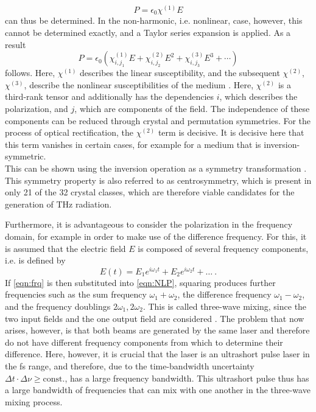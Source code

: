 \begin{equation}
    P =  \epsilon_0 \chi^{(1)}E
\end{equation}
can thus be determined.
In the non-harmonic, i.e. nonlinear, case, however, this cannot be determined exactly, and a
Taylor series expansion is applied.
As a result
\begin{equation}
    \label{eqn:NLP}
    P = \epsilon_0 \left(\chi^{(1)}_{i,j_1}E+\chi^{(2)}_{i,j_2}E^2+\chi^{(3)}_{i,j_3}E^3+\dotsb\right)
\end{equation}
follows. Here, $\chi^{(1)}$ describes the linear susceptibility, and the subsequent $\chi^{(2)}$,
$\chi^{(3)}$, describe the nonlinear susceptibilities of the medium \cite{Butcher_Cotter_1990}.
Here, $\chi^{(2)}$ is a third-rank tensor and additionally has the dependencies $i$, which
describes the polarization, and $j$, which are components of the field.
The independence of these components can be reduced through crystal and permutation symmetries.
For the process of optical rectification, the $\chi^{(2)}$ term is decisive.
It is decisive here that this term vanishes in certain cases,
for example for a medium that is inversion-symmetric. \\
This can be shown using the inversion operation as a symmetry transformation \cite[Ch. 5.3.2]{Butcher_Cotter_1990}.
This symmetry property is also referred to as centrosymmetry,
which is present in only 21 of the 32 crystal classes, which are therefore viable candidates
for the generation of THz radiation.

Furthermore, it is advantageous to consider the polarization in the frequency domain, for
example in order to make use of the difference frequency.
For this, it is assumed that the electric field $E$ is composed of several frequency components,
i.e. is defined by
\begin{equation}
    \label{eqn:frq}
    E(t)=E_1e^{i\omega_1 t}+E_2e^{i\omega_2 t} + \dots \ .
\end{equation}
If \eqref{eqn:frq} is then substituted into \eqref{eqn:NLP}, squaring produces further
frequencies such as the sum frequency $\omega_1+\omega_2$, the difference frequency
$\omega_1-\omega_2$, and the frequency doublings $2\omega_1,2\omega_2$.
This is called three-wave mixing, since the two input fields and the one output field are
considered \cite{Boyd2023}.
The problem that now arises, however, is that both beams are generated by the same laser and
therefore do not have different frequency components from which to determine their difference.
Here, however, it is crucial that the laser is an ultrashort pulse laser in the fs range, and
therefore, due to the time-bandwidth uncertainty $\Delta t\cdot \Delta \nu \ge \text{const.}$, has
a large frequency bandwidth.
This ultrashort pulse thus has a large bandwidth of frequencies that can mix with one another in
the three-wave mixing process.

